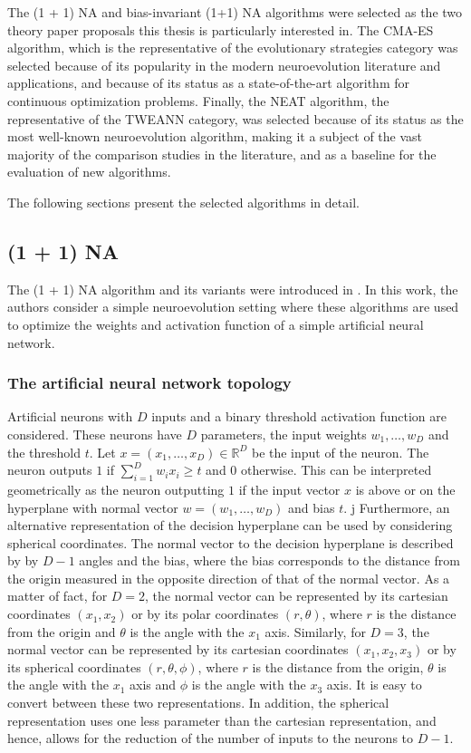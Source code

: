 The (1 + 1) NA and bias-invariant (1+1) NA algorithms were selected as the two theory paper proposals this thesis is particularly interested in.
The CMA-ES algorithm, which is the representative of the evolutionary strategies category was selected because of its popularity in the modern neuroevolution literature
and applications, and because of its status as a state-of-the-art algorithm for continuous optimization problems.
Finally, the NEAT algorithm, the representative of the TWEANN category, was selected because of its status as the most well-known neuroevolution algorithm, making
it a subject of the vast majority of the comparison studies in the literature, and as a baseline for the evaluation of new algorithms.

The following sections present the selected algorithms in detail.

\subsection{(1 + 1) NA}

The (1 + 1) NA algorithm and its variants were introduced in \cite{na}.
In this work, the authors consider a simple neuroevolution setting where these algorithms are used to optimize the weights and activation function of
a simple artificial neural network.

\subsubsection{The artificial neural network topology}

Artificial neurons with $D$ inputs and a binary threshold activation function are considered.
These neurons have $D$ parameters, the input weights $w_1, \ldots, w_D$ and the threshold $t$.
Let $x = (x_1, \ldots, x_D) \in \mathds{R}^D$ be the input of the neuron. The neuron outputs $1$ if $\sum_{i=1}^D w_i x_i \geq t$ and $0$
otherwise.
This can be interpreted geometrically as the neuron outputting $1$ if the input vector $x$ is above or on the hyperplane with normal vector
$w = (w_1, \ldots, w_D)$ and bias $t$.
j
Furthermore, an alternative representation of the decision hyperplane can be used by considering spherical coordinates.
The normal vector to the decision hyperplane is described by by $D - 1$ angles and the bias, where the bias corresponds to the distance from the origin
measured in the opposite direction of that of the normal vector.
As a matter of fact, for $D = 2$, the normal vector can be represented by its cartesian coordinates $(x_1, x_2)$ or by its polar coordinates
$(r, \theta)$, where $r$ is the distance from the origin and $\theta$ is the angle with the $x_1$ axis. Similarly, for $D = 3$, the normal vector can
be represented by its cartesian coordinates $(x_1, x_2, x_3)$ or by its spherical coordinates $(r, \theta, \phi)$, where $r$ is the distance from the
origin, $\theta$ is the angle with the $x_1$ axis and $\phi$ is the angle with the $x_3$ axis.
It is easy to convert between these two representations. In addition, the spherical representation uses one less parameter than the cartesian
representation, and hence, allows for the reduction of the number of inputs to the neurons to $D - 1$.


